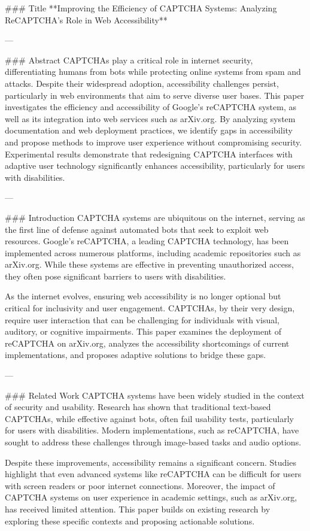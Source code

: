 ### Title
**Improving the Efficiency of CAPTCHA Systems: Analyzing ReCAPTCHA’s Role in Web Accessibility**

---

### Abstract
CAPTCHAs play a critical role in internet security, differentiating humans from bots while protecting online systems from spam and attacks. Despite their widespread adoption, accessibility challenges persist, particularly in web environments that aim to serve diverse user bases. This paper investigates the efficiency and accessibility of Google's reCAPTCHA system, as well as its integration into web services such as arXiv.org. By analyzing system documentation and web deployment practices, we identify gaps in accessibility and propose methods to improve user experience without compromising security. Experimental results demonstrate that redesigning CAPTCHA interfaces with adaptive user technology significantly enhances accessibility, particularly for users with disabilities.

---

### Introduction
CAPTCHA systems are ubiquitous on the internet, serving as the first line of defense against automated bots that seek to exploit web resources. Google's reCAPTCHA, a leading CAPTCHA technology, has been implemented across numerous platforms, including academic repositories such as arXiv.org. While these systems are effective in preventing unauthorized access, they often pose significant barriers to users with disabilities. 

As the internet evolves, ensuring web accessibility is no longer optional but critical for inclusivity and user engagement. CAPTCHAs, by their very design, require user interaction that can be challenging for individuals with visual, auditory, or cognitive impairments. This paper examines the deployment of reCAPTCHA on arXiv.org, analyzes the accessibility shortcomings of current implementations, and proposes adaptive solutions to bridge these gaps.

---

### Related Work
CAPTCHA systems have been widely studied in the context of security and usability. Research has shown that traditional text-based CAPTCHAs, while effective against bots, often fail usability tests, particularly for users with disabilities. Modern implementations, such as reCAPTCHA, have sought to address these challenges through image-based tasks and audio options.

Despite these improvements, accessibility remains a significant concern. Studies highlight that even advanced systems like reCAPTCHA can be difficult for users with screen readers or poor internet connections. Moreover, the impact of CAPTCHA systems on user experience in academic settings, such as arXiv.org, has received limited attention. This paper builds on existing research by exploring these specific contexts and proposing actionable solutions.

